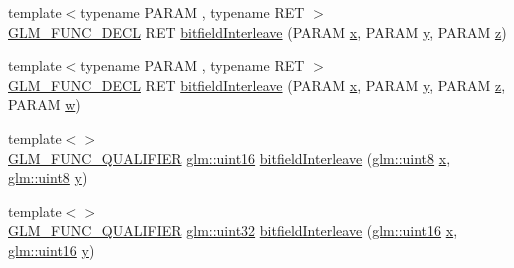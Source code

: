 \begin{DoxyCompactItemize}
\item 
{\footnotesize template$<$typename P\+A\+R\+AM , typename R\+ET $>$ }\\\hyperlink{setup_8hpp_ab2d052de21a70539923e9bcbf6e83a51}{G\+L\+M\+\_\+\+F\+U\+N\+C\+\_\+\+D\+E\+CL} R\+ET \hyperlink{namespaceglm_1_1detail_aa2fdd8f720417a13990873ba704a3426}{bitfield\+Interleave} (P\+A\+R\+AM \hyperlink{_s_d_l__opengl_8h_ad0e63d0edcdbd3d79554076bf309fd47}{x}, P\+A\+R\+AM \hyperlink{_s_d_l__opengl_8h_a1675d9d7bb68e1657ff028643b4037e3}{y}, P\+A\+R\+AM \hyperlink{_s_d_l__opengl__glext_8h_a5e74030ebb3297ce1b37ff716fedd68f}{z})
\item 
{\footnotesize template$<$typename P\+A\+R\+AM , typename R\+ET $>$ }\\\hyperlink{setup_8hpp_ab2d052de21a70539923e9bcbf6e83a51}{G\+L\+M\+\_\+\+F\+U\+N\+C\+\_\+\+D\+E\+CL} R\+ET \hyperlink{namespaceglm_1_1detail_a606f6dc8c8314159fafef68f820c2c65}{bitfield\+Interleave} (P\+A\+R\+AM \hyperlink{_s_d_l__opengl_8h_ad0e63d0edcdbd3d79554076bf309fd47}{x}, P\+A\+R\+AM \hyperlink{_s_d_l__opengl_8h_a1675d9d7bb68e1657ff028643b4037e3}{y}, P\+A\+R\+AM \hyperlink{_s_d_l__opengl__glext_8h_a5e74030ebb3297ce1b37ff716fedd68f}{z}, P\+A\+R\+AM \hyperlink{_s_d_l__opengl__glext_8h_a6ee8f168a7ab6785a9bb57c6715dad99}{w})
\item 
{\footnotesize template$<$$>$ }\\\hyperlink{setup_8hpp_a33fdea6f91c5f834105f7415e2a64407}{G\+L\+M\+\_\+\+F\+U\+N\+C\+\_\+\+Q\+U\+A\+L\+I\+F\+I\+ER} \hyperlink{group__gtc__type__precision_gad8c2939e1fdd8e5828b31d95c52255d5}{glm\+::uint16} \hyperlink{namespaceglm_1_1detail_ac59c574dc7900d87786f5a96f82ea6e7}{bitfield\+Interleave} (\hyperlink{group__gtc__type__precision_ga1a7dcd8aac97cc8020817c94049deff2}{glm\+::uint8} \hyperlink{_s_d_l__opengl_8h_ad0e63d0edcdbd3d79554076bf309fd47}{x}, \hyperlink{group__gtc__type__precision_ga1a7dcd8aac97cc8020817c94049deff2}{glm\+::uint8} \hyperlink{_s_d_l__opengl_8h_a1675d9d7bb68e1657ff028643b4037e3}{y})
\item 
{\footnotesize template$<$$>$ }\\\hyperlink{setup_8hpp_a33fdea6f91c5f834105f7415e2a64407}{G\+L\+M\+\_\+\+F\+U\+N\+C\+\_\+\+Q\+U\+A\+L\+I\+F\+I\+ER} \hyperlink{group__gtc__type__precision_ga202b6a53c105fcb7e531f9b443518451}{glm\+::uint32} \hyperlink{namespaceglm_1_1detail_ac5f2b38221d4447775e88f1b003f8113}{bitfield\+Interleave} (\hyperlink{group__gtc__type__precision_gad8c2939e1fdd8e5828b31d95c52255d5}{glm\+::uint16} \hyperlink{_s_d_l__opengl_8h_ad0e63d0edcdbd3d79554076bf309fd47}{x}, \hyperlink{group__gtc__type__precision_gad8c2939e1fdd8e5828b31d95c52255d5}{glm\+::uint16} \hyperlink{_s_d_l__opengl_8h_a1675d9d7bb68e1657ff028643b4037e3}{y})

\end{DoxyCompactItemize}
